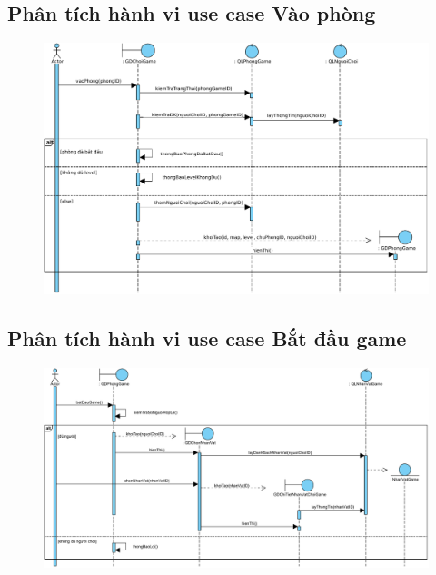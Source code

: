 \documentclass[3p]{elsarticle}
\begin{document}
\subsection{Phân tích hành vi use case Vào phòng}
\begin{figure}[!htbp]
	\hspace*{-.5in}
	\centering
	\includegraphics[scale=.55]{images/sequence-pdfs/gamer/PlayGame_EnterGame.pdf}
\end{figure}
\newpage

\subsection{Phân tích hành vi use case Bắt đầu game}
\begin{figure}[!htbp]
	\hspace*{-.5in}
	\centering
	\includegraphics[scale=.5]{images/sequence-pdfs/gamer/PlayGame_Start.pdf}
\end{figure}
\end{document}
